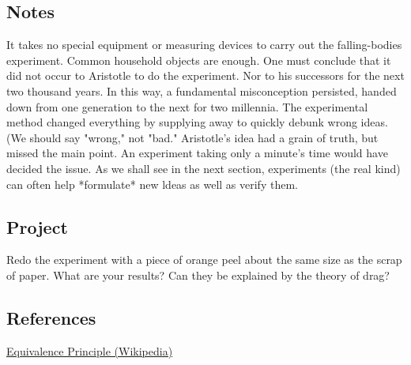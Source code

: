 \subsection{Notes}

It takes no special equipment or measuring devices to carry out the falling-bodies experiment.  Common household objects are enough.  One must conclude that it did not occur to Aristotle to do the experiment. Nor to his successors for the next two thousand years. In this way, a fundamental misconception persisted, handed down from one generation to the next for two millennia.  The experimental method changed everything by supplying away to quickly debunk wrong ideas. (We should say "wrong," not "bad."  Aristotle's idea had a grain of truth, but missed the main point.  An experiment taking only a minute's time would have decided the issue.  As we shall see in the next section, experiments (the real kind) can often help *formulate* new ldeas as well as verify them.


\subsection{Project}

Redo the experiment with a piece of orange peel about the same size as the scrap of paper.  What are your results?  Can they be explained by the theory of drag?



\subsection{References}

\href{https://en.wikipedia.org/wiki/Equivalence_principle}{Equivalence Principle (Wikipedia)}




